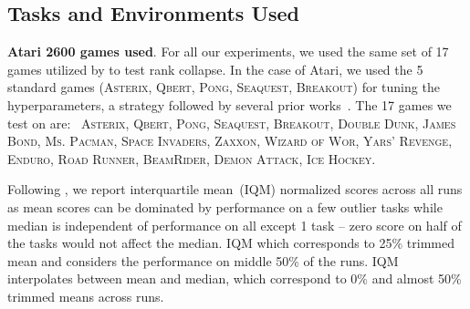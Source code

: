 \vspace{-0.2cm}
\subsection{Tasks and Environments Used}
\label{app:tasks}
\vspace{-0.2cm}

{\bf Atari 2600 games used}. For all our experiments, we used the same set of 17 games utilized by \citet{kumar2021implicit} to test rank collapse. In the case of Atari, we used the 5 standard games (\textsc{Asterix}, \textsc{Qbert}, \textsc{Pong}, \textsc{Seaquest}, \textsc{Breakout}) for tuning the hyperparameters, a strategy followed by several prior works~\citep{gulcehre2020rl,agarwal2019optimistic,kumar2021implicit}. The 17 games we test on are: \ \textsc{Asterix}, \textsc{Qbert}, \textsc{Pong}, \textsc{Seaquest}, \textsc{Breakout}, \textsc{Double Dunk}, \textsc{James Bond}, \textsc{Ms. Pacman}, \textsc{Space Invaders}, \textsc{Zaxxon}, \textsc{Wizard of Wor}, \textsc{Yars' Revenge}, \textsc{Enduro}, \textsc{Road Runner}, \textsc{BeamRider}, \textsc{Demon Attack}, \textsc{Ice Hockey}.

Following \citet{agarwal2021precipice}, we report interquartile mean~(IQM) normalized scores across all runs as mean scores can be dominated by performance on a few outlier tasks while median is independent of performance on all except 1 task -- zero score on half of the tasks would not affect the median. IQM which corresponds to 25\% trimmed mean and considers the performance on middle 50\% of the runs. IQM interpolates between mean and median, which correspond to 0\% and almost 50\% trimmed means across runs.



